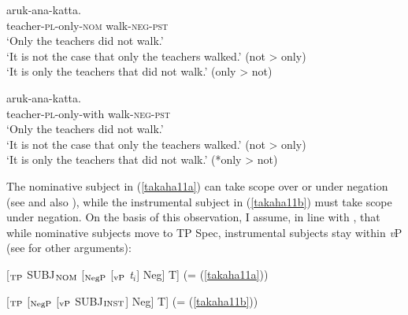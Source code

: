 \documentclass[output=paper]{langscibook}
\begin{document}
\begin{exe}
\ex \label{takaha11}
\begin{xlist}
\ex \label{takaha11a}
 {aruk-ana-katta}.\\
teacher-\textsc{pl}-only-\textsc{nom} walk-\textsc{neg}-\textsc{pst}\\
\glt `Only the teachers did not walk.'\\
`It is not the case that only the teachers walked.' (not \textgreater{} only)\\
`It is only the teachers that did not walk.’ (only \textgreater{} not)

\ex \label{takaha11b}
 {aruk-ana-katta}.\\
teacher-\textsc{pl}-only-with walk-\textsc{neg}-\textsc{pst}\\
\glt `Only the teachers did not walk.’  \\
‘It is not the case that only the teachers walked.' (not \textgreater{} only)\\
`It is only the teachers that did not walk.’ (*only \textgreater{} not)\\
\end{xlist}
\end{exe}

The nominative subject in (\ref{takaha11a}) can take scope over or under negation (see \citealt{Sakai2000} and also \citealt{Kataoka2006}), while the instrumental subject in (\ref{takaha11b}) must take scope under negation. On the basis of this observation, I assume, in line with \citet{Kishimoto2010}, that while nominative subjects move to TP Spec, instrumental subjects stay within \emph{v}P (see \citealt{Kishimoto2010} for other arguments):

\begin{exe}
\ex 
\begin{xlist}
\ex \label{takaha12a} [$_{\textnormal{TP}}$ \hspace{2mm} SUBJ$_{\textnormal{NOM}}$ \hspace{2mm} [$_{\textnormal{NegP}}$ \hspace{1mm} [$_{\textnormal{vP}}$ \hspace{8mm} \emph{t}$_{i}$\hspace{8mm}] Neg] T] (= (\ref{takaha11a}))

\ex \label{takaha12b} [$_{\textnormal{TP}}$ \hspace{21mm} [$_{\textnormal{NegP}}$ \hspace{1mm} [$_{\textnormal{vP}}$ \hspace{1.7mm} SUBJ$_{\textnormal{INST}}$\hspace{1.7mm}] Neg] T] (= (\ref{takaha11b}))
\end{xlist}
\end{exe}
\end{document}
